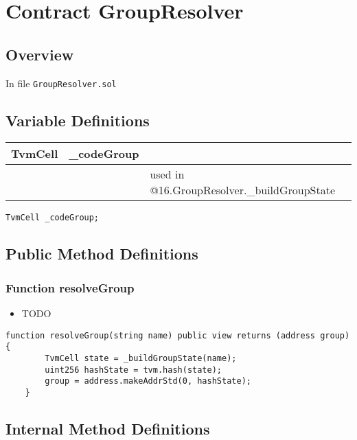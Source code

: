 
\chapter{Contract GroupResolver}

\minitoc

\section{Overview}


In file {\tt GroupResolver.sol}

\section{Variable Definitions}


\ifsoltables
\noindent\begin{tabular}{|l|l|p{5cm}|}\hline
TvmCell & \_{}codeGroup &  \\\hline
 & & used in @16.GroupResolver.\_{}buildGroupState\\\hline
\end{tabular}
\fi


\begin{lstlisting}[firstnumber=8]
    TvmCell _codeGroup;
\end{lstlisting}

\section{Public Method Definitions}


\subsection{Function resolveGroup}

\begin{itemize}
\item TODO
\end{itemize}

\begin{lstlisting}[firstnumber=10]
    function resolveGroup(string name) public view returns (address group) {
        TvmCell state = _buildGroupState(name);
        uint256 hashState = tvm.hash(state);
        group = address.makeAddrStd(0, hashState);
    }
\end{lstlisting}

\section{Internal Method Definitions}



